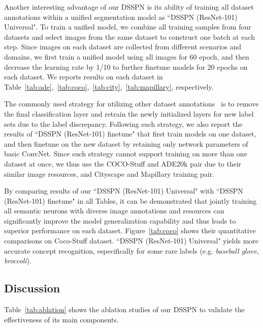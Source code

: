 \documentclass[10pt,twocolumn,letterpaper]{article}
\begin{document}
Another interesting advantage of our DSSPN is its ability of training all dataset annotations within a unified segmentation model as ``DSSPN (ResNet-101) Universal". To train a unified model, we combine all training samples from four datasets and select images from the same dataset to construct one batch at each step. Since images on each dataset are collected from different scenarios and domains, we first train a unified model using all images for 60 epoch, and then decrease the learning rate by 1/10 to further finetune models for 20 epochs on each dataset. We reports results on each dataset in Table~\ref{tab:ade},~\ref{tab:coco},~\ref{tab:city},~\ref{tab:mapillary}, respectively. 

The commonly used strategy for utilizing other dataset annotations~\cite{chen2016deeplab,zhao2016pyramid} is to remove the final classification layer and retrain the newly initialized layers for new label sets due to the label discrepancy. Following such strategy, we also report the results of ``DSSPN (ResNet-101) finetune" that first train models on one dataset, and then finetune on the new dataset by retaining only network parameters of basic ConvNet. Since such strategy cannot support training on more than one dataset at once, we thus use the COCO-Stuff and ADE20k pair due to their similar image resources, and Cityscape and Mapillary training pair.

By comparing results of our ``DSSPN (ResNet-101) Universal" with ``DSSPN (ResNet-101) finetune" in all Tables, it can be demonstrated that jointly training all semantic neurons with diverse image annotations and resources can significantly improve the model generalization capability and thus leads to superior performance on each dataset. Figure~\ref{tab:coco} shows their quantitative comparisons on Coco-Stuff dataset. ``DSSPN (ResNet-101) Universal" yields more accurate concept recognition, especifically for some rare labels (e.g. \emph{baseball glove}, \emph{broccoli}).

\subsection{Discussion}

Table~\ref{tab:ablation} shows the ablation studies of our DSSPN to validate the effectiveness of its main components.
\end{document}
